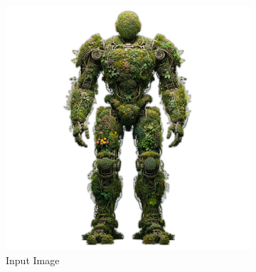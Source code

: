 \begin{figure}[H]
\begin{subfigure}[b]{0.38\textwidth}
        \includegraphics[width=\textwidth]{etc/a robot made out of plants/magic123/robot made out of plants_noBG_resized.png}
        \caption{Input Image}
    \end{subfigure}
    \begin{subfigure}[b]{0.21\textwidth}
        \centering

\end{subfigure}
\end{figure}
